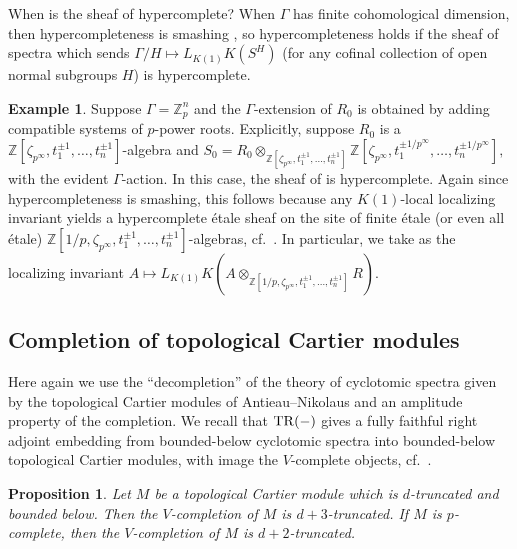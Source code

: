 \documentclass{amsart}
\newtheorem{proposition}[theorem]{Proposition}
\theoremstyle{definition}
\newtheorem{example}[theorem]{Example}
\begin{document}
When is the sheaf of  hypercomplete? 
When $\Gamma$ has finite cohomological dimension, 
then 
hypercompleteness is smashing \cite[Sec.~4.1]{CM19}, so hypercompleteness holds if 
the sheaf 
of spectra which sends
$\Gamma/H  \mapsto L_{K(1)} K( S^H)$ (for any cofinal collection of open
normal subgroups $H$) is
hypercomplete. 


\begin{example} 
\label{ppowerrootex}
Suppose $\Gamma = \mathbb{Z}_p^n$ and the $\Gamma$-extension of $R_0$ is obtained
by adding compatible systems of $p$-power roots. 
Explicitly, suppose $R_0$ is a $\mathbb{Z}[ \zeta_{p^\infty}, t_1^{\pm 1}, \dots, t_n^{\pm
1}]$-algebra and $S_0 =R_0 \otimes_{\mathbb{Z}[ \zeta_{p^\infty}, t_1^{\pm 1}, \dots, t_n^{\pm
1}]}
\mathbb{Z}[ \zeta_{p^\infty}, t_1^{\pm 1/p^\infty}, \dots, t_n^{\pm
1/p^\infty}]
,$ with the evident $\Gamma$-action.  
In this case, the 
sheaf of  is hypercomplete. 
Again since hypercompleteness is smashing, this follows because
any $K(1)$-local localizing invariant 
yields a hypercomplete \'etale sheaf on the site 
of finite \'etale (or even all \'etale) $\mathbb{Z}[1/p, \zeta_{p^\infty},  t_1^{\pm 1}, \dots,
t_n^{\pm 1}]$-algebras, cf.~\cite[Th.~7.14]{CM19}. 
In particular, we take as the localizing invariant
$A \mapsto L_{K(1)} K(A \otimes_{\mathbb{Z}[1/p, \zeta_{p^\infty}, t_1^{\pm 1},
\dots, t_n^{\pm 1}]}
R)$. 
\end{example} 





\subsection{Completion of topological Cartier modules}
Here again we use the ``decompletion'' of the theory of
cyclotomic spectra given by the topological Cartier modules of
Antieau--Nikolaus \cite{AN} and an
amplitude property of the completion. 
We recall that $\mathrm{TR}(-)$ gives a fully faithful right adjoint embedding from
bounded-below cyclotomic spectra into bounded-below topological Cartier modules, with 
image the $V$-complete objects, cf.~\cite[Th.~3.21]{AN}. 

\begin{proposition} 
\label{completionCart}
Let $M$ be a   topological Cartier module which is $d$-truncated and bounded
below. 
Then the $V$-completion of $M$ is $d+3$-truncated. 
If $M$ is $p$-complete, then the $V$-completion of $M$ is $d+2$-truncated. 
\end{proposition} 
\end{document}
